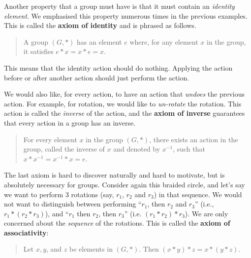 Another property that a group must have is that it must contain an \textit{identity element}. We emphasised this property numerous times in the previous examples. This is called the \textbf{axiom of identity} and is phrased as follows.
\begin{quote}
    A group $(G, \ast)$ has an element $e$ where, for any element $x$ in the group, it satisfies $e \ast x = x \ast e = x$.
\end{quote}
This means that the identity action should do nothing. Applying the action before or after another action should just perform the action.

We would also like, for every action, to have an action that \textit{undoes} the previous action. For example, for rotation, we would like to \textit{un-rotate} the rotation. This action is called the \textit{inverse} of the action, and the \textbf{axiom of inverse} guarantees that every action in a group has an inverse.

\newpage

\begin{quote}
    For every element $x$ in the group $(G, \ast)$, there exists an action in the group, called the inverse of $x$ and denoted by $x^{-1}$, such that $x \ast x^{-1} = x^{-1} \ast x = e$.
\end{quote}

\begin{figure}
    \centering
\end{figure}

The last axiom is hard to discover naturally and hard to motivate, but is absolutely necessary for groups. Consider again this braided circle, and let's say we want to perform 3 rotations (say, $r_1$, $r_2$ and $r_3$) in that sequence. We would not want to distinguish between performing ``$r_1$, then $r_2$ and $r_3$'' (i.e., $r_1 \ast (r_2 \ast r_3)$), and ``$r_1$ then $r_2$, then $r_3$'' (i.e. $(r_1 \ast r_2) \ast r_3$). We are only concerned about the \textit{sequence} of the rotations. This is called the \textbf{axiom of associativity}:
\begin{quote}
    Let $x, y$, and $z$ be elements in $(G, \ast)$. Then $(x \ast y) \ast z = x \ast (y \ast z)$.
\end{quote}

